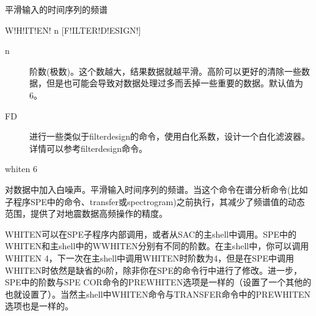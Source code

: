 \label{cmd:whiten}

平滑输入的时间序列的频谱

\begin{SACSTX}
W!H!IT!EN! n [F!ILTER!D!ESIGN!]
\end{SACSTX}

\begin{description}
\item [n]  阶数(极数)。这个数越大，结果数据就越平滑。高阶可以更好的清除一些数据，但是也可能会导致对数据处理过多而丢掉一些重要的数据。默认值为6。 
\item [FD] 进行一些类似于filterdesign的命令，使用白化系数，设计一个白化滤波器。详情可以参考filterdesign命令。
\end{description}

\begin{SACDFT}
whiten 6
\end{SACDFT}


对数据中加入白噪声。平滑输入时间序列的频谱。当这个命令在谱分析命令(比如子程序SPE中的命令、transfer或spectrogram)之前执行，其减少了频谱值的动态范围，提供了对地震数据高频操作的精度。

WHITEN可以在SPE子程序内部调用，或者从SAC的主shell中调用。SPE中的WHITEN和主shell中的WWHITEN分别有不同的阶数。在主shell中，你可以调用WHITEN 4，下一次在主shell中调用WHITEN时阶数为4，但是在SPE中调用WHITEN时依然是缺省的6阶，除非你在SPE的命令行中进行了修改。进一步，SPE中的阶数与SPE COR命令的PREWHITEN选项是一样的（设置了一个其他的也就设置了）。当然主shell中WHITEN命令与TRANSFER命令中的PREWHITEN选项也是一样的。

